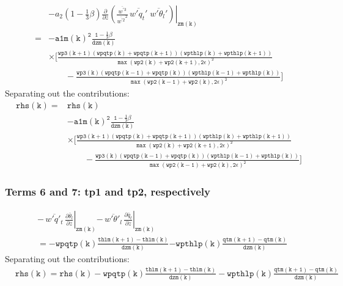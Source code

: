 \documentclass[11pt,fleqn]{article}
\newcommand{\ptlder}[2]{\frac{\partial #1}{\partial #2}}
\begin{document}
\begin{equation}
\begin{split}
& - \left. a_2 \left( 1 - \frac{1}{3}\beta \right)
       \ptlder{}{z}
         \left( 
           \frac{\overline{w^{'3}}}{\overline{w^{'2}}^2} \,
           \overline{w'q_t'} \; \overline{w'\theta_l'}
         \right) \right|_{\mathtt{zm(k)}} \\
=& \mathtt{
   - a1m(k)^{2}\frac{1 - \frac{1}{3}\beta}{dzm(k)} } \\
 & \mathtt{
     \times \bigg[ \frac{wp3(k+1) 
                         \left(wpqtp(k)+wpqtp(k+1)\right)
                         \left(wpthlp(k)+wpthlp(k+1)\right)}
                        {\max\left(wp2(k)+wp2(k+1),2\epsilon\right)^2} } \\
 & \mathtt{ \quad \quad
                  -\frac{wp3(k) 
                         \left(wpqtp(k-1)+wpqtp(k)\right)
                         \left(wpthlp(k-1)+wpthlp(k)\right)}
                        {\max\left(wp2(k-1)+wp2(k),2\epsilon\right)^2}
            \bigg]
   }
\end{split}
\end{equation}
%
Separating out the contributions:
%
\begin{equation}
\begin{split}
\mathtt{rhs(k)} =& \mathtt{rhs(k)} \\
 & \mathtt{ - a1m(k)^{2}\frac{1 - \frac{1}{3}\beta}{dzm(k)} } \\
 & \mathtt{ \times 
      \bigg[ \frac{wp3(k+1) 
                   \left(wpqtp(k)+wpqtp(k+1)\right) 
                   \left(wpthlp(k)+wpthlp(k+1)\right)}
                  {\max\left(wp2(k)+wp2(k+1),2\epsilon\right)^2} } \\
 & \mathtt{ \quad \quad
            -\frac{wp3(k) 
                   \left(wpqtp(k-1)+wpqtp(k)\right) 
                   \left(wpthlp(k-1)+wpthlp(k)\right)}
                  {\max\left(wp2(k-1)+wp2(k),2\epsilon\right)^2}
      \bigg]
   }
\end{split}
\end{equation}

\subsubsection{Terms 6 and 7:  tp1 and tp2, respectively}

\begin{equation}
\begin{split}
&\left. -\,\overline{w'q'_t} \, \ptlder{\bar{\theta}_l}{z} \right|_{\mathtt{zm(k)}}
 \left. -\,\overline{w'\theta'_l} \, \ptlder{\bar{q}_t}{z} \right|_{\mathtt{zm(k)}} \\
&= \mathtt{ - wpqtp(k) \frac{thlm(k+1)-thlm(k)}{dzm(k)} }
   \mathtt{ - wpthlp(k) \frac{qtm(k+1)-qtm(k)}{dzm(k)} }
\end{split}
\end{equation}
%
Separating out the contributions:
%
\begin{equation}
\begin{split}
&\mathtt{rhs(k) = rhs(k) - wpqtp(k) \frac{thlm(k+1)-thlm(k)}{dzm(k)}
                     - wpthlp(k) \frac{qtm(k+1)-qtm(k)}{dzm(k)} }
\end{split}
\end{equation}
\end{document}
